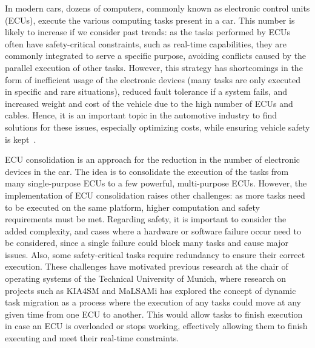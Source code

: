 In modern cars, dozens of computers, commonly known as electronic control units (ECUs), execute the various computing tasks present in a car. This number is likely to increase if we consider past trends: as the tasks performed by ECUs often have safety-critical constraints, such as real-time capabilities, they are commonly integrated to serve a specific purpose, avoiding conflicts caused by the parallel execution of other tasks. However, this strategy has shortcomings in the form of inefficient usage of the electronic devices (many tasks are only executed in specific and rare situations), reduced fault tolerance if a system fails, and increased weight and cost of the vehicle due to the high number of ECUs and cables. Hence, it is an important topic in the automotive industry to find solutions for these issues, especially optimizing costs, while ensuring vehicle safety is kept~\parencite{mckinsey1}.

ECU consolidation is an approach for the reduction in the number of electronic devices in the car. The idea is to consolidate the execution of the tasks from many single-purpose ECUs to a few powerful, multi-purpose ECUs. However, the implementation of ECU consolidation raises other challenges: as more tasks need to be executed on the same platform, higher computation and safety requirements must be met. Regarding safety, it is important to consider the added complexity, and cases where a hardware or software failure occur need to be considered, since a single failure could block many tasks and cause major issues. Also, some safety-critical tasks require redundancy to ensure their correct execution. These challenges have motivated previous research at the chair of operating systems of the Technical University of Munich, where research on projects such as KIA4SM and MaLSAMi has explored the concept of dynamic task migration as a process where the execution of any tasks could move at any given time from one ECU to another. This would allow tasks to finish execution in case an ECU is overloaded or stops working, effectively allowing them to finish executing and meet their real-time constraints.

